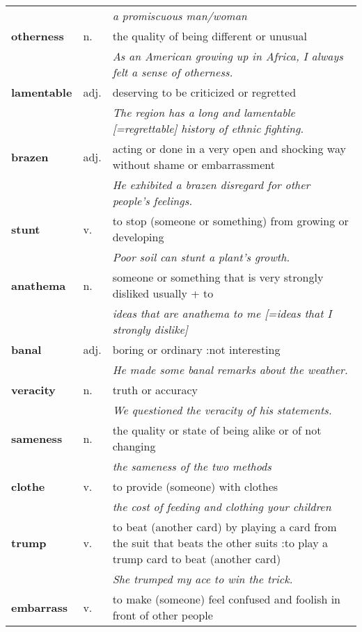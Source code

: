 \documentclass[a4paper]{article}
\begin{document}
\begin{longtable}{llp{11cm}}
 & & \textit{a promiscuous man/woman}\\[0.08cm]
\textbf{otherness} & n. &  the quality of being different or unusual \\
 & & \textit{As an American growing up in Africa, I always felt a sense of otherness.}\\[0.08cm]
\textbf{lamentable} & adj. &  deserving to be criticized or regretted \\
 & & \textit{The region has a long and lamentable [=regrettable] history of ethnic fighting.}\\[0.08cm]
\textbf{brazen} & adj. &  acting or done in a very open and shocking way without shame or embarrassment \\
 & & \textit{He exhibited a brazen disregard for other people's feelings.}\\[0.08cm]
\textbf{stunt} & v. &  to stop (someone or something) from growing or developing \\
 & & \textit{Poor soil can stunt a plant's growth.}\\[0.08cm]
\textbf{anathema} & n. &  someone or something that is very strongly disliked usually + to \\
 & & \textit{ideas that are anathema to me [=ideas that I strongly dislike]}\\[0.08cm]
\textbf{banal} & adj. &  boring or ordinary :not interesting \\
 & & \textit{He made some banal remarks about the weather.}\\[0.08cm]
\textbf{veracity} & n. &  truth or accuracy \\
 & & \textit{We questioned the veracity of his statements.}\\[0.08cm]
\textbf{sameness} & n. &  the quality or state of being alike or of not changing \\
 & & \textit{the sameness of the two methods}\\[0.08cm]
\textbf{clothe} & v. &  to provide (someone) with clothes \\
 & & \textit{the cost of feeding and clothing your children}\\[0.08cm]
\textbf{trump} & v. &  to beat (another card) by playing a card from the suit that beats the other suits :to play a trump card to beat (another card) \\
 & & \textit{She trumped my ace to win the trick.}\\[0.08cm]
\textbf{embarrass} & v. &  to make (someone) feel confused and foolish in front of other people \\

\end{longtable}
\end{document}
